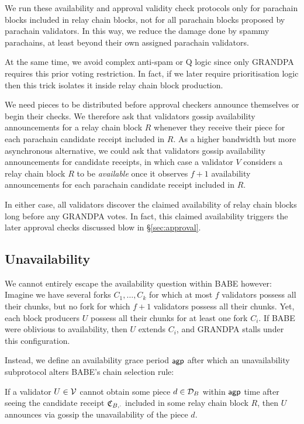 We run these availability and approval validity check protocols only for parachain blocks included in relay chain blocks, not for all parachain blocks proposed by parachain validators.  In this way, we reduce the damage done by spammy parachains, at least beyond their own assigned parachain validators.

At the same time, we avoid complex anti-spam or Q logic since only GRANDPA requires this prior voting restriction.  In fact, if we later require prioritisation logic then this trick isolates it inside relay chain block production.

We need pieces to be distributed before approval checkers announce themselves or begin their checks.  We therefore ask that validators gossip availability announcements for a relay chain block $R$ whenever they receive their piece for each parachain candidate receipt included in $R$.  As a higher bandwidth but more asynchronous alternative, we could ask that validators gossip availability announcements for candidate receipts, in which case a validator $V$ considers a relay chain block $R$ to be {\em available} once it observes $f+1$ availability announcements for each parachain candidate receipt included in $R$.

In either case, all validators discover the claimed availability of relay chain blocks long before any GRANDPA votes.  In fact, this claimed availability triggers the later approval checks discussed blow in \S\ref{sec:approval}.  


\subsection{Unavailability} %
\label{sec:unavailability}

We cannot entirely escape the availability question within BABE however:  Imagine we have several forks $C_1,\ldots,C_k$ for which at most $f$ validators possess all their chunks, but no fork for which $f+1$ validators possess all their chunks.  Yet, each block producers $U$ possess all their chunks for at least one fork $C_i$.  If BABE were oblivious to availability, then $U$ extends $C_i$, and GRANDPA stalls under this configuration. 

Instead, we define an availability grace period $\mathsf{agp}$ after which an unavailability subprotocol alters BABE's chain selection rule:  

If a validator $U \in \mathcal{V}$ cannot obtain some piece $d \in \mathcal{D}_B$ within $\mathsf{agp}$ time after seeing the candidate receipt $\mathfrak{C}_{B,\cdot}$ included in some relay chain block $R$, then $U$ announces via gossip the unavailability of the piece $d$. 

